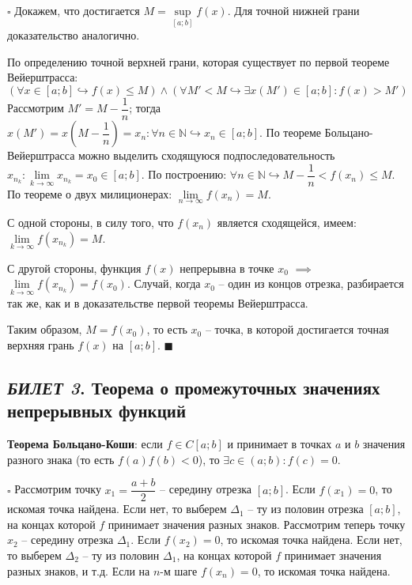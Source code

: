 \documentclass[12pt, a4paper, reqno]{article}
\begin{document}
    $\square$ Докажем, что достигается $M = \sup\limits_{[a; b]} f(x)$. Для точной нижней грани
    доказательство аналогично.

    По определению точной верхней грани, которая существует по первой теореме Вейерштрасса:
    \begin{equation*}
        (\forall x\in[a; b]\hookrightarrow f(x)\leq M)\wedge(\forall M' < M\hookrightarrow
        \exists x(M')\in[a; b]: f(x) > M')
    \end{equation*}
    Рассмотрим $M' = M - \dfrac{1}{n}$; тогда $x(M') = x\left(M - \dfrac{1}{n}\right) = x_n: \forall
    n\in\mathbb{N}\hookrightarrow x_n\in[a; b]$. По теореме Больцано-Вейерштрасса можно выделить
    сходящуюся подпоследовательность $x_{n_k}: \lim\limits_{k\to\infty} x_{n_k} = x_0\in[a; b]$. По
    построению: $\forall n\in\mathbb{N} \hookrightarrow M - \dfrac{1}{n} < f(x_n) \leq M$.
    По теореме о двух милиционерах: $\lim\limits_{n\to\infty} f(x_n) = M$.

    С одной стороны, в силу того, что $f(x_n)$ является сходящейся, имеем:
    $\lim\limits_{k\to\infty}f(x_{n_k}) = M$.

    С другой стороны, функция $f(x)$ непрерывна в точке $x_0$ $\implies$
    $\lim\limits_{k\to\infty}f(x_{n_k}) = f(x_0)$. Случай, когда $x_0$ -- один из концов
    отрезка, разбирается так же, как и в доказательстве первой теоремы Вейерштрасса.

    Таким образом, $M = f(x_0)$, то есть $x_0$ -- точка, в которой достигается точная верхняя грань
    $f(x)$ на $[a; b]$. $\blacksquare$

\newpage
\subsection{\textit{БИЛЕТ 3}. Теорема о промежуточных значениях непрерывных функций}

    \textbf{Теорема Больцано-Коши}: если $f \in C[a; b]$ и принимает в точках $a$ и $b$ значения
    разного знака (то есть $f(a)f(b) < 0$), то $\exists c\in(a; b): f(c) = 0$.

    $\square$ Рассмотрим точку $x_1 = \dfrac{a+b}{2}$ -- середину отрезка $[a; b]$. Если $f(x_1) = 0$,
    то искомая точка найдена. Если нет, то выберем $\Delta_1$ -- ту из половин отрезка $[a; b]$, на
    концах которой $f$ принимает значения разных знаков. Рассмотрим теперь точку $x_2$ -- середину
    отрезка $\Delta_1$. Если $f(x_2) = 0$, то искомая точка найдена. Если нет, то выберем $\Delta_2$
    -- ту из половин $\Delta_1$, на концах которой $f$ принимает значения разных знаков, и т.д.
    Если на $n$-м шаге $f(x_n) = 0$, то искомая точка найдена.
\end{document}
